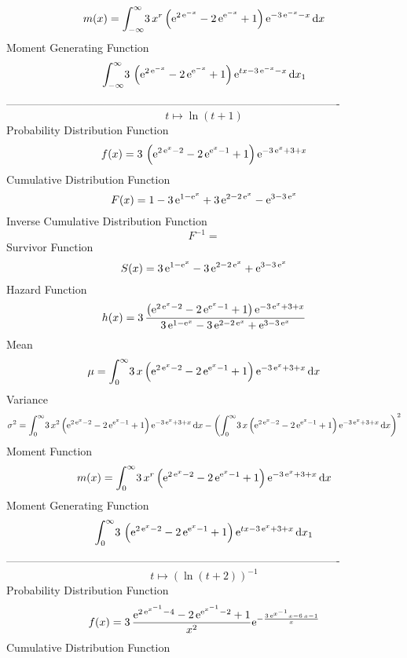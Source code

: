 \documentclass[12pt]{article}
\begin{document}
 $$ m(x) = \int_{-\infty }^{\infty }\!3\,{x}^{r} \left( {{\rm e}^{2\,{{\rm e}^{-x
}}}}-2\,{{\rm e}^{{{\rm e}^{-x}}}}+1 \right) {{\rm e}^{-3\,{{\rm e}^{-
x}}-x}}\,{\rm d}x
$$ Moment Generating Function 
 $$\int_{-\infty }^{\infty }\!3\, \left( {{\rm e}^{2\,{{\rm e}^{-x}}}}-2
\,{{\rm e}^{{{\rm e}^{-x}}}}+1 \right) {{\rm e}^{tx-3\,{{\rm e}^{-x}}-
x}}\,{\rm d}x_{{1}}
$$-------------------------------------------------------------------------------------------  \\$$t\mapsto \ln  \left( t+1 \right) 
$$Probability Distribution Function 
$$  f(x)=3\, \left( {{\rm e}^{2\,{{\rm e}^{x}}-2}}-2\,{{\rm e}^{{{\rm e}^{x}}-1
}}+1 \right) {{\rm e}^{-3\,{{\rm e}^{x}}+3+x}}
$$Cumulative Distribution Function  
 $$F(x)=1-3\,{{\rm e}^{1-{{\rm e}^{x}}}}+3\,{{\rm e}^{2-2\,{{\rm e}^{x}}}}-{
{\rm e}^{3-3\,{{\rm e}^{x}}}}
$$ Inverse Cumulative Distribution Function 
  $$F^{-1} = 
$$Survivor Function 
 $$ S(x)=3\,{{\rm e}^{1-{{\rm e}^{x}}}}-3\,{{\rm e}^{2-2\,{{\rm e}^{x}}}}+{
{\rm e}^{3-3\,{{\rm e}^{x}}}}
$$ Hazard Function 
 $$ h(x)=3\,{\frac { \left( {{\rm e}^{2\,{{\rm e}^{x}}-2}}-2\,{{\rm e}^{{
{\rm e}^{x}}-1}}+1 \right) {{\rm e}^{-3\,{{\rm e}^{x}}+3+x}}}{3\,{
{\rm e}^{1-{{\rm e}^{x}}}}-3\,{{\rm e}^{2-2\,{{\rm e}^{x}}}}+{{\rm e}^
{3-3\,{{\rm e}^{x}}}}}}
$$Mean 
 $$ \mu=\int_{0}^{\infty }\!3\,x \left( {{\rm e}^{2\,{{\rm e}^{x}}-2}}-2\,{
{\rm e}^{{{\rm e}^{x}}-1}}+1 \right) {{\rm e}^{-3\,{{\rm e}^{x}}+3+x}}
\,{\rm d}x
$$ Variance 
 $$ \sigma^2 = \int_{0}^{\infty }\!3\,{x}^{2} \left( {{\rm e}^{2\,{{\rm e}^{x}}-2}}-2
\,{{\rm e}^{{{\rm e}^{x}}-1}}+1 \right) {{\rm e}^{-3\,{{\rm e}^{x}}+3+
x}}\,{\rm d}x- \left( \int_{0}^{\infty }\!3\,x \left( {{\rm e}^{2\,{
{\rm e}^{x}}-2}}-2\,{{\rm e}^{{{\rm e}^{x}}-1}}+1 \right) {{\rm e}^{-3
\,{{\rm e}^{x}}+3+x}}\,{\rm d}x \right) ^{2}
$$Moment Function 
 $$ m(x) = \int_{0}^{\infty }\!3\,{x}^{r} \left( {{\rm e}^{2\,{{\rm e}^{x}}-2}}-2
\,{{\rm e}^{{{\rm e}^{x}}-1}}+1 \right) {{\rm e}^{-3\,{{\rm e}^{x}}+3+
x}}\,{\rm d}x
$$ Moment Generating Function 
 $$\int_{0}^{\infty }\!3\, \left( {{\rm e}^{2\,{{\rm e}^{x}}-2}}-2\,{
{\rm e}^{{{\rm e}^{x}}-1}}+1 \right) {{\rm e}^{tx-3\,{{\rm e}^{x}}+3+x
}}\,{\rm d}x_{{1}}
$$-------------------------------------------------------------------------------------------  \\$$t\mapsto  \left( \ln  \left( t+2 \right)  \right) ^{-1}
$$Probability Distribution Function 
$$  f(x)=3\,{\frac {{{\rm e}^{2\,{{\rm e}^{{x}^{-1}}}-4}}-2\,{{\rm e}^{{{\rm e}
^{{x}^{-1}}}-2}}+1}{{x}^{2}}{{\rm e}^{-{\frac {3\,{{\rm e}^{{x}^{-1}}}
x-6\,x-1}{x}}}}}
$$Cumulative Distribution Function  
\end{document}
